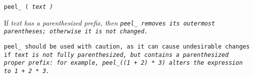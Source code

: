 
\tt{peel_ (} \it{text} \tt{)}


If \it{text} has a parenthesized prefix, then \tt {peel_}
removes its outermost parentheses; otherwise it is not changed.

\note \tt{peel_} should be used with caution, as it can cause undesirable changes
if \it{text} is not fully parenthesized, but contains a parenthesized proper prefix:
for example, \tt{peel_((1 + 2) * 3)} alters the expression to \tt{1 + 2 * 3}.
